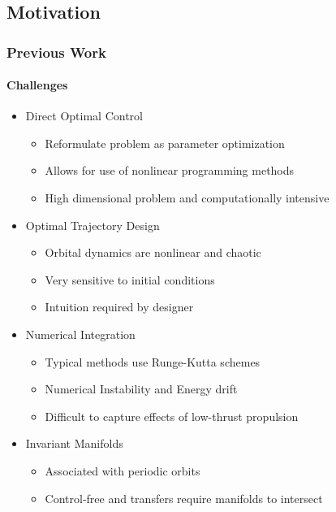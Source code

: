 \section*{}
\subsection*{Motivation}

\begin{frame} %
\frametitle{Previous Work} %
\framesubtitle{Challenges}
\begin{itemize}
	\item Direct Optimal Control
		\begin{itemize}
			\item Reformulate problem as parameter optimization
			\item Allows for use of nonlinear programming methods
			\item High dimensional problem and computationally intensive
		\end{itemize}
	\pause
	\item Optimal Trajectory Design
		\begin{itemize}
			\item Orbital dynamics are nonlinear and chaotic
			\item Very sensitive to initial conditions
			\item Intuition required by designer
		\end{itemize}
	\pause
	\item Numerical Integration
		\begin{itemize}
			\item Typical methods use Runge-Kutta schemes
			\item Numerical Instability and Energy drift
			\item Difficult to capture effects of low-thrust propulsion
		\end{itemize}
	\item Invariant Manifolds
		\begin{itemize}
			\item Associated with periodic orbits
			\item Control-free and transfers require manifolds to intersect
		\end{itemize}
\end{itemize}
\end{frame}   %

